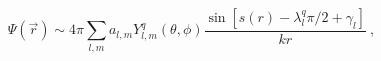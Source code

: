 \begin{equation}
\label{Psi}
\Psi(\vec{r})\sim 4\pi\sum_{l,m}a_{l,m}Y_{l,m}^q(\theta,\phi)
\frac{\sin[s(r)-\lambda_l^q\pi/2+\gamma_l]}{kr} \ ,
\end{equation}

